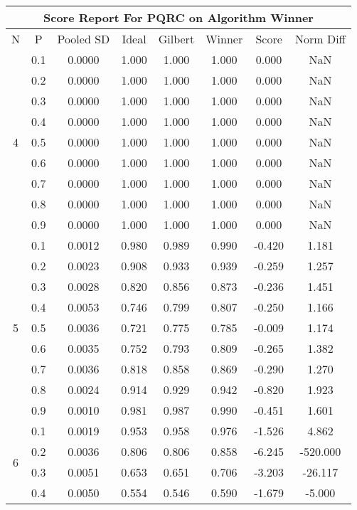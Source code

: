 \documentclass[11pt,a4paper]{report}
\begin{document}
\begin{longtable}{ | c | c || c | c | c | c | c | c | }
\hline
\multicolumn{8}{|c|}{ Score Report For PQRC on Algorithm Winner} \\
\hline
N & P & Pooled SD &  Ideal &  Gilbert & Winner  & Score & Norm Diff \\
 \hline
 \hline
 \endhead
\multirow{9}{*}{4} & 0.1 & 0.0000 & 1.000 & 1.000 & 1.000 & 0.000 & NaN \\
 & 0.2 & 0.0000 & 1.000 & 1.000 & 1.000 & 0.000 & NaN \\
 & 0.3 & 0.0000 & 1.000 & 1.000 & 1.000 & 0.000 & NaN \\
 & 0.4 & 0.0000 & 1.000 & 1.000 & 1.000 & 0.000 & NaN \\
 & 0.5 & 0.0000 & 1.000 & 1.000 & 1.000 & 0.000 & NaN \\
 & 0.6 & 0.0000 & 1.000 & 1.000 & 1.000 & 0.000 & NaN \\
 & 0.7 & 0.0000 & 1.000 & 1.000 & 1.000 & 0.000 & NaN \\
 & 0.8 & 0.0000 & 1.000 & 1.000 & 1.000 & 0.000 & NaN \\
 & 0.9 & 0.0000 & 1.000 & 1.000 & 1.000 & 0.000 & NaN \\
 \hline
\multirow{9}{*}{5} & 0.1 & 0.0012 & 0.980 & 0.989 & 0.990 & -0.420 & 1.181 \\
 & 0.2 & 0.0023 & 0.908 & 0.933 & 0.939 & -0.259 & 1.257 \\
 & 0.3 & 0.0028 & 0.820 & 0.856 & 0.873 & -0.236 & 1.451 \\
 & 0.4 & 0.0053 & 0.746 & 0.799 & 0.807 & -0.250 & 1.166 \\
 & 0.5 & 0.0036 & 0.721 & 0.775 & 0.785 & -0.009 & 1.174 \\
 & 0.6 & 0.0035 & 0.752 & 0.793 & 0.809 & -0.265 & 1.382 \\
 & 0.7 & 0.0036 & 0.818 & 0.858 & 0.869 & -0.290 & 1.270 \\
 & 0.8 & 0.0024 & 0.914 & 0.929 & 0.942 & -0.820 & 1.923 \\
 & 0.9 & 0.0010 & 0.981 & 0.987 & 0.990 & -0.451 & 1.601 \\
 \hline
\multirow{9}{*}{6} & 0.1 & 0.0019 & 0.953 & 0.958 & 0.976 & -1.526 & 4.862 \\
 & 0.2 & 0.0036 & 0.806 & 0.806 & 0.858 & -6.245 & -520.000 \\
 & 0.3 & 0.0051 & 0.653 & 0.651 & 0.706 & -3.203 & -26.117 \\
 & 0.4 & 0.0050 & 0.554 & 0.546 & 0.590 & -1.679 & -5.000 \\

\end{longtable}
\end{document}
